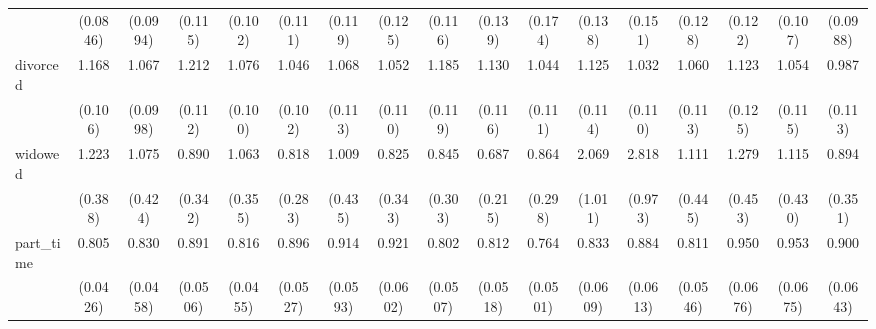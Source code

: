 {\begin{tabular}{l*{16}{c}}
                    &    (0.0846)         &    (0.0994)         &     (0.115)         &     (0.102)         &     (0.111)         &     (0.119)         &     (0.125)         &     (0.116)         &     (0.139)         &     (0.174)         &     (0.138)         &     (0.151)         &     (0.128)         &     (0.122)         &     (0.107)         &    (0.0988)         \\
[1em]
divorced            &       1.168         &       1.067         &       1.212\sym{*}  &       1.076         &       1.046         &       1.068         &       1.052         &       1.185         &       1.130         &       1.044         &       1.125         &       1.032         &       1.060         &       1.123         &       1.054         &       0.987         \\
                    &     (0.106)         &    (0.0998)         &     (0.112)         &     (0.100)         &     (0.102)         &     (0.113)         &     (0.110)         &     (0.119)         &     (0.116)         &     (0.111)         &     (0.114)         &     (0.110)         &     (0.113)         &     (0.125)         &     (0.115)         &     (0.113)         \\
[1em]
widowed             &       1.223         &       1.075         &       0.890         &       1.063         &       0.818         &       1.009         &       0.825         &       0.845         &       0.687         &       0.864         &       2.069         &       2.818\sym{**} &       1.111         &       1.279         &       1.115         &       0.894         \\
                    &     (0.388)         &     (0.424)         &     (0.342)         &     (0.355)         &     (0.283)         &     (0.435)         &     (0.343)         &     (0.303)         &     (0.215)         &     (0.298)         &     (1.011)         &     (0.973)         &     (0.445)         &     (0.453)         &     (0.430)         &     (0.351)         \\
[1em]
part\_time           &       0.805\sym{***}&       0.830\sym{***}&       0.891\sym{*}  &       0.816\sym{***}&       0.896         &       0.914         &       0.921         &       0.802\sym{***}&       0.812\sym{**} &       0.764\sym{***}&       0.833\sym{*}  &       0.884         &       0.811\sym{**} &       0.950         &       0.953         &       0.900         \\
                    &    (0.0426)         &    (0.0458)         &    (0.0506)         &    (0.0455)         &    (0.0527)         &    (0.0593)         &    (0.0602)         &    (0.0507)         &    (0.0518)         &    (0.0501)         &    (0.0609)         &    (0.0613)         &    (0.0546)         &    (0.0676)         &    (0.0675)         &    (0.0643)         \\

\end{tabular}}
